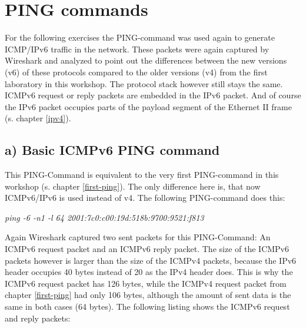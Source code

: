 \section{PING commands}
\label{pingv6}
For the following exercises the PING-command was used again to generate ICMP/IPv6 traffic in the network. These packets were again captured by Wireshark and analyzed to point out the differences between the new versions (v6) of these protocols compared to the older versions (v4) from the first laboratory in this workshop. The protocol stack however still stays the same. ICMPv6 request or reply packets are embedded in the IPv6 packet. And of course the IPv6 packet occupies parts of the payload segment of the Ethernet II frame (s. chapter \ref{ipv4}).
\subsection{a) Basic ICMPv6 PING command}
This PING-Command is equivalent to the very first PING-command in this workshop (s. chapter \ref{first-ping}). The only difference here is, that now ICMPv6/IPv6 is used instead of v4. The following PING-command does this:
\begin{center}
	\textit{ping -6 -n1 -l 64 2001:7c0:c00:19d:518b:9700:9521:f813}
\end{center}
Again Wireshark captured two sent packets for this PING-Command: An ICMPv6 request packet and an ICMPv6 reply packet. The size of the ICMPv6 packets however is larger than the size of the ICMPv4 packets, because the IPv6 header occupies 40 bytes instead of 20 as the IPv4 header does. This is why the ICMPv6 request packet has 126 bytes, while the ICMPv4 request packet from chapter \ref{first-ping} had only 106 bytes, although the amount of sent data is the same in both cases (64 bytes). The following listing shows the ICMPv6 request and reply packets:
\\

